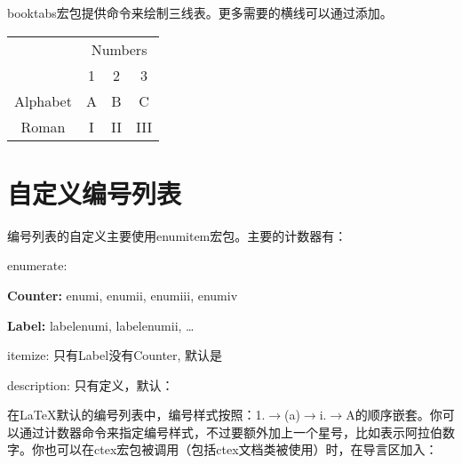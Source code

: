 booktabs宏包提供命令来绘制三线表。更多需要的横线可以通过\latexline{\\midrule}添加。

\begin{codeshow}
\begin{tabular}{cccc}
\toprule
& \multicolumn{3}{c}{Numbers} \\
\cmidrule{2-4}
& 1 & 2 & 3 \\
\midrule
Alphabet & A & B & C \\
Roman & I & II& III \\
\bottomrule
\end{tabular}
\end{codeshow}

\section{自定义编号列表}
\label{sec:list}
编号列表的自定义主要使用enumitem宏包。主要的计数器有：
\begin{feai}
\item enumerate:
  \begin{feai}
    \item \textbf{Counter:} enumi, enumii, enumiii, enumiv
    \item \textbf{Label:} labelenumi, labelenumii, \ldots
  \end{feai}
\item itemize: 只有Label没有Counter, 默认是\latexline{\\textbullet}
\item description: 只有\latexline{\\descriptionlabel}定义，默认：
\begin{latex}{}
\newcomand*{}
\end{latex}
\end{feai}

在\LaTeX 默认的编号列表中，编号样式按照：1.$\rightarrow$(a)$\rightarrow$i.$\rightarrow$A的顺序嵌套。你可以通过计数器命令来指定编号样式，不过要额外加上一个星号，比如\latexline{\arabic*}表示阿拉伯数字。你也可以在ctex宏包被调用（包括ctex文档类被使用）时，在导言区加入：
\begin{latex}{}
\AddEnumerateCounter{\chinese}{\chinese}{}
\end{latex}

